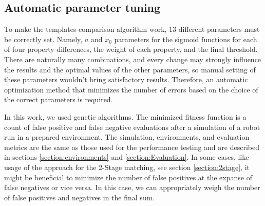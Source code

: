 \subsection{Automatic parameter tuning}\label{section:parameterTuning}

To make the templates comparison algorithm work, 13 different parameters must be correctly set. Namely, $a$ and $x_0$ parameters for the sigmoid functions for each of four property differences, the weight of each property, and the final threshold. There are naturally many combinations, and every change may strongly influence the results and the optimal values of the other parameters, so manual setting of these parameters wouldn't bring satisfactory results. Therefore, an automatic optimization method that minimizes the number of errors based on the choice of the correct parameters is required.\par
In this work, we used genetic algorithms\cite{geneticAlg}. The minimized fitness function is a count of false positive and false negative evaluations after a simulation of a robot run in a prepared environment. The simulation, environments, and evaluation metrics are the same as those used for the performance testing and are described in sections \ref{section:environments} and \ref{section:Evaluation}. In some cases, like usage of the approach for the 2-Stage matching, see section \ref{section:2stage}, it might be beneficial to minimize the number of false positives at the expanse of false negatives or vice versa. In this case, we can appropriately weigh the number of false positives and negatives in the final sum.